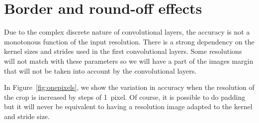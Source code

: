 \begin{table*}
\caption{\label{tab:adaptlaw}
    Matching  distribution before the last Relu  application to  ResNet-50: 
    Resulting top-1 accuracy \% on ImageNet validation set
  }  
\end{table*}


\section{Border and round-off effects}
\label{sec:roundoff}

Due to the complex discrete nature of convolutional layers, the accuracy is not a monotonous function of the input resolution. 
There is a strong dependency on the kernel sizes and strides used in the first convolutional layers. 
Some resolutions will not match with these parameters so we will have a part of the images margin that will not be taken into account by the convolutional layers. 

In Figure~\ref{fig:onepixels}, we show the variation in accuracy when the resolution of the crop is increased by steps of 1~pixel.  
Of course, it is possible to do padding but it will never be equivalent to having a resolution image adapted to the kernel and stride size.

